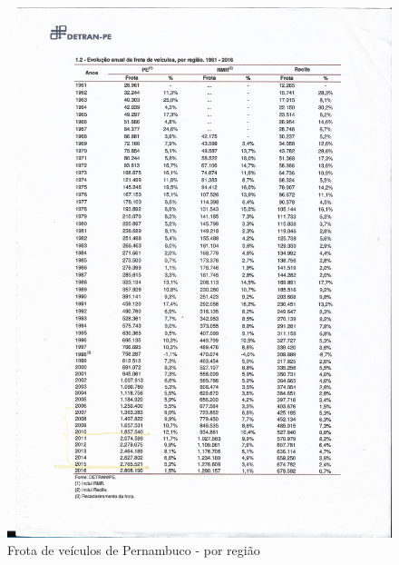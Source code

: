 \begin{figure}[ht!]
	\centering
	\caption{Frota de veículos de Pernambuco - por região}
	\includegraphics[scale=0.35]{Figuras/Anexos/A1-FrotaPE.pdf}
\end{figure}
	

%		

		


